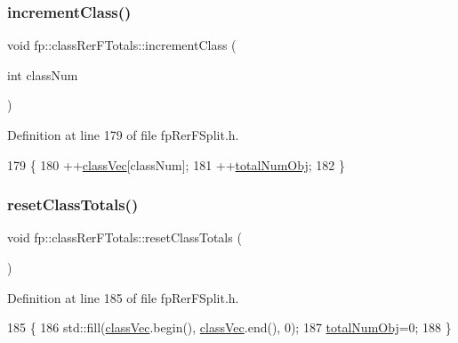 \subsubsection{\texorpdfstring{increment\+Class()}{incrementClass()}}
{\footnotesize\ttfamily void fp\+::class\+Rer\+F\+Totals\+::increment\+Class (\begin{DoxyParamCaption}\item[{int}]{class\+Num }\end{DoxyParamCaption})\hspace{0.3cm}{\ttfamily [inline]}}



Definition at line 179 of file fp\+Rer\+F\+Split.\+h.


\begin{DoxyCode}
179                                                     \{
180                 ++\hyperlink{classfp_1_1classRerFTotals_a4a7b583fc52d7631771f5dd04d20a68a}{classVec}[classNum];
181                 ++\hyperlink{classfp_1_1classRerFTotals_a0963284a03586b3a25c284bdb35f9e44}{totalNumObj};
182             \}
\end{DoxyCode}
\mbox{\label{classfp_1_1classRerFTotals_a60fa9a8dab5fdbfe5c2cb8e6b1f24579}} 
\subsubsection{\texorpdfstring{reset\+Class\+Totals()}{resetClassTotals()}}
{\footnotesize\ttfamily void fp\+::class\+Rer\+F\+Totals\+::reset\+Class\+Totals (\begin{DoxyParamCaption}{ }\end{DoxyParamCaption})\hspace{0.3cm}{\ttfamily [inline]}}



Definition at line 185 of file fp\+Rer\+F\+Split.\+h.


\begin{DoxyCode}
185                                           \{
186                 std::fill(\hyperlink{classfp_1_1classRerFTotals_a4a7b583fc52d7631771f5dd04d20a68a}{classVec}.begin(), \hyperlink{classfp_1_1classRerFTotals_a4a7b583fc52d7631771f5dd04d20a68a}{classVec}.end(), 0);
187                 \hyperlink{classfp_1_1classRerFTotals_a0963284a03586b3a25c284bdb35f9e44}{totalNumObj}=0;
188             \}
\end{DoxyCode}
\mbox{\label{classfp_1_1classRerFTotals_a3f9028fdb2c7cc6d098a7dd565bf6e68}} 
